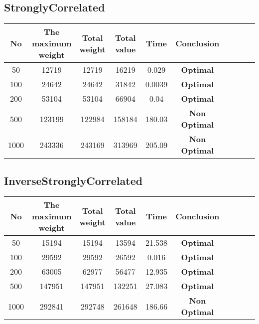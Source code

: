 \documentclass{article}
\begin{document}
\subsection{StronglyCorrelated}
    \begin{center}
        \begin{tabular}{|c|c| c|c| c|c| c|c| c|c|}
        \hline
            No& The maximum weight & Total weight & Total value& Time&Conclusion \\
        \hline
            50 & 12719 & 12719 & 16219 & 0.029 & \textbf{Optimal}\\
            100 & 24642 & 24642 & 31842 & 0.0039 & \textbf{Optimal}\\
            200 & 53104 & 53104 & 66904 & 0.04 & \textbf{Optimal}\\
            500 & 123199 & 122984 & 158184 & 180.03 & \textbf{Non Optimal}\\
            1000 & 243336 & 243169 & 313969 & 205.09 & \textbf{Non Optimal}\\
    \hline
        \hline 
        \end{tabular}
    \end{center}
\subsection{InverseStronglyCorrelated}
    \begin{center}
        \begin{tabular}{|c|c| c|c| c|c| c|c| c|c|}
        \hline
            No& The maximum weight & Total weight & Total value& Time&Conclusion \\
        \hline
            50 & 15194 & 15194 & 13594 & 21.538 & \textbf{Optimal}\\
            100 & 29592 & 29592 & 26592 & 0.016 & \textbf{Optimal}\\
            200 & 63005 & 62977 & 56477 & 12.935 & \textbf{Optimal}\\
            500 & 147951 & 147951 & 132251 & 27.083 & \textbf{Optimal}\\
            1000 & 292841 & 292748 & 261648 & 186.66 & \textbf{Non Optimal}\\
    \hline
        \hline 
        \end{tabular}
    \end{center}
\end{document}
